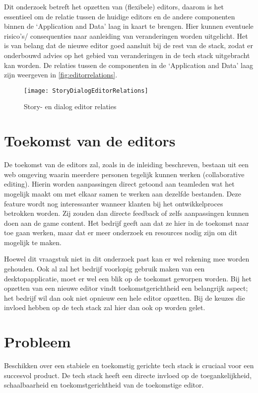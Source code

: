 Dit onderzoek betreft het opzetten van (flexibele) editors, daarom is het essentieel om de relatie tussen de huidige editors en de andere componenten binnen de ‘Application and Data’ laag in kaart te brengen. Hier kunnen eventuele risico’s/ consequenties naar aanleiding van veranderingen worden uitgelicht. Het is van belang dat de nieuwe editor goed aansluit bij de rest van de stack, zodat er onderbouwd advies op het gebied van veranderingen in de tech stack uitgebracht kan worden. De relaties tussen de componenten in de ‘Application and Data’ laag zijn weergeven in \autoref{fig:editorrelations}.

\begin{figure}[htb]
    \texttt{[image: StoryDialogEditorRelations]}
    \caption{Story- en dialog editor relaties}
    \label{fig:editorrelations}
    \centering
\end{figure}

\section{Toekomst van de editors}
\label{sec:editorfuture}
De toekomst van de editors zal, zoals in de inleiding beschreven, bestaan uit een web omgeving waarin meerdere personen tegelijk kunnen werken (collaborative editing). Hierin worden aanpassingen direct getoond aan teamleden wat het mogelijk maakt om met elkaar samen te werken aan dezelfde bestanden. Deze feature wordt nog interessanter wanneer klanten bij het ontwikkelproces betrokken worden. Zij zouden dan directe feedback of zelfs aanpassingen kunnen doen aan de game content. Het bedrijf geeft aan dat ze hier in de toekomst naar toe gaan werken, maar dat er meer onderzoek en resources nodig zijn om dit mogelijk te maken.

Hoewel dit vraagstuk niet in dit onderzoek past kan er wel rekening mee worden gehouden. Ook al zal het bedrijf voorlopig gebruik maken van een desktopapplicatie, moet er wel een blik op de toekomst geworpen worden. Bij het opzetten van een nieuwe editor vindt \organisation{} toekomstgerichtheid een belangrijk aspect; het bedrijf wil dan ook niet opnieuw een hele editor opzetten. Bij de keuzes die invloed hebben op de tech stack zal hier dan ook op worden gelet.

\section{Probleem}
Beschikken over een stabiele en toekomstig gerichte tech stack is cruciaal voor een succesvol product. De tech stack heeft een directe invloed op de toegankelijkheid, schaalbaarheid en toekomstgerichtheid van de toekomstige editor. 

